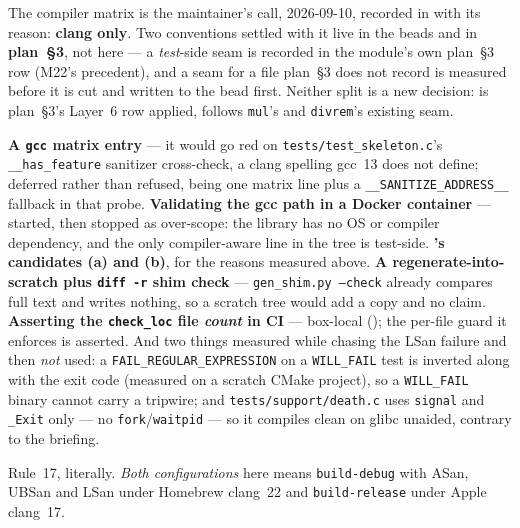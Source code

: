 The compiler matrix is the maintainer's call, 2026-09-10, recorded in
 with its reason: \textbf{clang only}. Two conventions settled with it
live in the beads and in \textbf{plan~§3}, not here --- a \emph{test}-side seam
is recorded in the module's own plan~§3 row (M22's precedent), and a seam for a
file plan~§3 does not record is measured before it is cut and written to the bead
first. Neither split is a new decision:  is plan~§3's Layer~6 row
applied,  follows \texttt{mul}'s and \texttt{divrem}'s existing seam.

\textbf{A \texttt{gcc} matrix entry} --- it would go red on
\texttt{tests/test\_skeleton.c}'s \texttt{\_\_has\_feature} sanitizer
cross-check, a clang spelling gcc~13 does not define; deferred rather than
refused, being one matrix line plus a \texttt{\_\_SANITIZE\_ADDRESS\_\_} fallback
in that probe. \textbf{Validating the gcc path in a Docker container} ---
started, then stopped as over-scope: the library has no OS or compiler
dependency, and the only compiler-aware line in the tree is test-side.
\textbf{'s candidates (a) and (b)}, for the reasons measured above.
\textbf{A regenerate-into-scratch plus \texttt{diff -r} shim check} ---
\texttt{gen\_shim.py --check} already compares full text and writes nothing, so a
scratch tree would add a copy and no claim. \textbf{Asserting the
\texttt{check\_loc} file \emph{count} in CI} --- box-local (); the
per-file guard it enforces is asserted. And two things measured while chasing the
LSan failure and then \emph{not} used: a \texttt{FAIL\_REGULAR\_EXPRESSION} on a
\texttt{WILL\_FAIL} test is inverted along with the exit code (measured on a
scratch CMake project), so a \texttt{WILL\_FAIL} binary cannot carry a tripwire;
and \texttt{tests/support/death.c} uses \texttt{signal} and \texttt{\_Exit}
only --- no \texttt{fork}/\texttt{waitpid} --- so it compiles clean on glibc
unaided, contrary to the briefing.

Rule~17, literally. \emph{Both configurations} here means \texttt{build-debug}
with ASan, UBSan and LSan under Homebrew clang~22 and \texttt{build-release}
under Apple clang~17.

